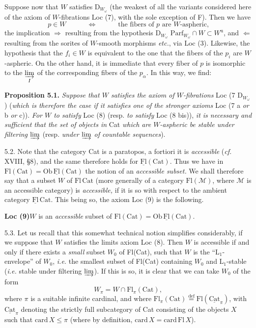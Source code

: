 \documentclass[11pt]{article}
\newcommand{\printedpage}[1]{\marginpar{\footnotesize p.~#1}}
\newcommand{\msp}[1]{\marginpar{\footnotesize [#1]}}
\newcommand{\uFl}{\underline{\mathrm{Fl}}}
\newcommand{\uCat}{\underline{\mathrm{Cat}}}
\newcommand{\Parf}{\mathrm{Parf}}
\begin{document}
Suppose now that $W$ satisfies $\mathrm{D}_{W_\omega}$ (the weakest of all the variants considered here of the axiom of $W$-fibrations Loc (7), with the sole exception of F). Then we have
\[
p \in W \qquad\quad \Longleftrightarrow \qquad\quad \text{the fibers of $p$ are $W$-aspheric,}
\]
\printedpage{41}
the implication $\Longrightarrow$ resulting from the hypothesis $\mathrm{D}_{W_\omega}$ $\Parf_{W_\omega} \cap W \subset W^{\mathrm{u}}$, and $\Longleftarrow$ resulting from the sorites of $W$-smooth morphisms \textit{etc.}, via Loc (3). Likewise, the hypothesis that the $f_i \in W$ is equivalent to the one that the fibers of the $p_i$ are $W$-aspheric. On the other hand, it is immediate that
\msp{page 74}
every fiber of $p$ is isomorphic to the $\varinjlim\limits_{I}$ of the corresponding fibers of the $p_\alpha$. In this way, we find:

\textbf{Proposition 5.1.} \textit{Suppose that $W$ satisfies the axiom of $W$-fibrations} Loc (7 $\mathrm{D}_{W_\omega}$) (\textit{which is therefore the case if it satisfies one of the stronger axioms} Loc (7 a \textit{or} b \textit{or} c)). \textit{For $W$ to satisfy} Loc (8) (resp. \textit{to satisfy} Loc (8 bis)), \textit{it is necessary and sufficient that the set of objects in} Cat \textit{which are $W$-aspheric be stable under filtering $\varinjlim$} (resp. \textit{under $\varinjlim$ of countable sequences}).

5.2. Note that the category Cat is a paratopos, a fortiori it is \textit{accessible} (\textit{cf.} XVIII, §8), and the same therefore holds for $\uFl(\mathrm{Cat})$. Thus we have in $\mathrm{Fl}(\mathrm{Cat}) = \mathrm{Ob}\,\uFl(\mathrm{Cat})$ the notion of an \textit{accessible subset.} We shall therefore say that a subset $W$ of $\mathrm{Fl}\,\mathrm{Cat}$ (more generally of a category $\mathrm{Fl}(\mathcal{M})$, where $\mathcal{M}$ is an accessible category) is \textit{accessible,} if it is so with respect to the ambient category
\msp{page 75}
$\uFl\,\mathrm{Cat}$. This being so, the axiom Loc (9) is the following.

\textbf{Loc (9)}\quad $W$ is an \textit{accessible} subset of $\mathrm{Fl}(\mathrm{Cat}) = \mathrm{Ob}\,\uFl(\mathrm{Cat})$.

5.3. Let us recall that this somewhat technical notion simplifies considerably, if we suppose that $W$ satisfies the limits axiom Loc (8). Then $W$ is accessible if and only if there exists a \textit{small} subset $W_0$ of Fl(Cat), such that $W$ is the ``L$_1$-envelope'' of $W_0$, \textit{i.e.} the smallest subset of Fl(Cat) containing $W_0$ and L$_1$-stable (\textit{i.e.} stable under filtering $\varinjlim$). If this is so, it is clear that we can take $W_0$ of the form
\[
W_\pi = W \cap \mathrm{Fl}_\pi(\mathrm{Cat}),
\]
where $\pi$ is a suitable infinite cardinal, and where $\mathrm{Fl}_\pi(\mathrm{Cat}) \overset{\text{def}}{=} \mathrm{Fl}(\uCat_\pi)$, with $\uCat_\pi$ denoting the strictly full subcategory of Cat consisting of the objects $X$ such that $\mathrm{card}\,X \leq \pi$ (where by definition, $\mathrm{card}\,X = \mathrm{card}\,\mathrm{Fl}\,X$).
\end{document}

